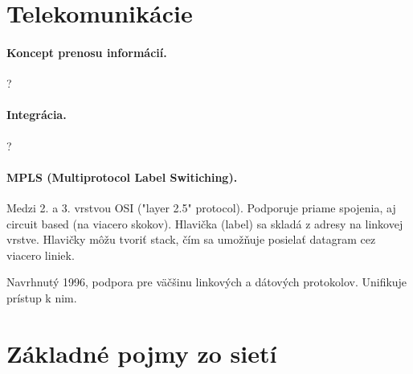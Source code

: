 \section{Telekomunikácie}           
\paragraph{Koncept prenosu informácií.} 
?

\paragraph{Integrácia.}
?
               
\paragraph{MPLS (Multiprotocol Label Switiching).}
Medzi 2. a 3. vrstvou OSI ("layer 2.5" protocol). 
Podporuje priame spojenia, aj circuit based (na viacero skokov).
Hlavička (label) sa skladá z adresy na linkovej vrstve. Hlavičky môžu tvoriť stack, čím sa umožňuje posielať datagram cez viacero liniek.

Navrhnutý 1996, podpora pre väčšinu linkových a dátových protokolov. Unifikuje prístup k nim. 

\section{Základné pojmy zo sietí}    
